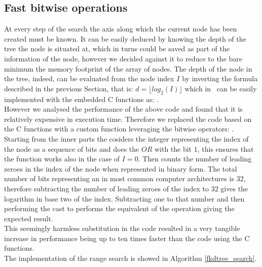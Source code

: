 \subsection{Fast bitwise operations}
At every step of the search the axis along which the current node has been created must be known. It can be easily deduced by knowing the depth of the tree the node is situated at, which in turns could be saved as part of the information of the node, however we decided against it to reduce to the bare minimum the memory footprint of the array of nodes. The depth of the node in the tree, indeed, can be evaluated from the node index $I$ by inverting the formula described in the previous Section, that is: $d = \lfloor log_2(I) \rfloor$ which in \CC\ can be easily implemented with the embedded C functions as: .\\
However we analysed the performance of the above code and found that it is relatively expensive in execution time. Therefore we replaced the code based on the C functions with a custom function leveraging the bitwise operators: . Starting from the inner parts the  cosiders the integer representing the index of the node as a sequence of bits and does the $OR$ with the bit $1$, this ensures that the function works also in the case of $I = 0$. Then  counts the number of leading zeroes in the index of the node when represented in binary form. The total number of bits representing an  in most common computer architectures is 32, therefore subtracting the number of leading zeroes of the index to 32 gives the logarithm in base two of the index. Subtracting one to that number and then performing the cast to  performs the equivalent of the  operation giving the expected result.\\
This seemingly harmless substitution in the code resulted in a very tangible increase in performance being up to ten times faster than the code using the C functions.\\
The implementation of the range search is showed in Algorithm \ref{fkdtree_search}.\\

